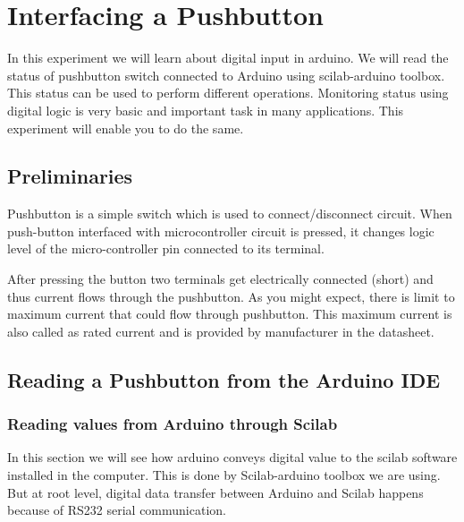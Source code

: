 \chapter{Interfacing a Pushbutton}
\thispagestyle{empty}
\label{pushbutton}

\newcommand{\LocPushfig}{\Origin/user-code/push/figures}
\newcommand{\LocPushscicode}{\Origin/user-code/push/scilab}
\newcommand{\LocPushscibrief}{Orign/user-code/push/scilab}
\newcommand{\LocPushardcode}{\Origin/user-code/push/arduino}
\newcommand{\LocPushardbrief}{Orign/user-code/push/arduino}

\newcommand{\LocPushbrief}{Orign/user-code/push/code}

In this experiment we will learn about digital input in arduino. We will read the status of pushbutton switch connected to Arduino using scilab-arduino toolbox. This status can be used  to perform different operations. Monitoring status using digital logic is very basic and important task in many applications. This experiment will enable you to do the same. 

\section{Preliminaries}
Pushbutton is a simple switch which is used to connect/disconnect circuit. When push-button interfaced with microcontroller circuit is pressed, it changes logic level of the micro-controller pin connected to its terminal. 

After pressing the button two terminals get electrically connected (short) and thus current flows through the pushbutton. As you might expect, there is limit to maximum current that could flow through pushbutton. This maximum current is also called as rated current and is provided by manufacturer in the datasheet.

\section{Reading a Pushbutton from the Arduino IDE}

\subsection{Reading values from Arduino through Scilab}
In this section we will see how arduino conveys digital value to the scilab software installed in the computer. This is done by Scilab-arduino toolbox we are using. But at root level, digital data transfer between Arduino and Scilab happens because of RS232 serial communication.  

